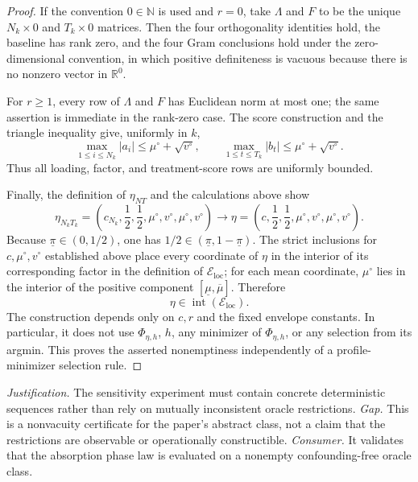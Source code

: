 \documentclass{article}
\begin{document}
\begin{proof}
If the convention \(0\in\mathbb N\) is used and \(r=0\), take \(\Lambda\) and \(F\) to be the unique \(N_k\times0\) and \(T_k\times0\) matrices. Then the four orthogonality identities hold, the baseline has rank zero, and the four Gram conclusions hold under the zero-dimensional convention, in which positive definiteness is vacuous because there is no nonzero vector in \(\mathbb R^0\).

For \(r\ge1\), every row of \(\Lambda\) and \(F\) has Euclidean norm at most one; the same assertion is immediate in the rank-zero case. The score construction and the triangle inequality give, uniformly in \(k\),
\[
 \max_{1\le i\le N_k}|a_i|
 \le\mu^\circ+\sqrt{v^\circ},
 \qquad
 \max_{1\le t\le T_k}|b_t|
 \le\mu^\circ+\sqrt{v^\circ}.
\]
Thus all loading, factor, and treatment-score rows are uniformly bounded.

Finally, the definition of \(\eta_{NT}\) and the calculations above show
\[
 \eta_{N_kT_k}
 =\left(c_{N_k},\frac12,\frac12,
         \mu^\circ,v^\circ,\mu^\circ,v^\circ\right)
 \longrightarrow
 \eta
 =\left(c,\frac12,\frac12,
         \mu^\circ,v^\circ,\mu^\circ,v^\circ\right).
\]
Because \(\underline\pi\in(0,1/2)\), one has \(1/2\in(\underline\pi,1-\underline\pi)\). The strict inclusions for \(c,\mu^\circ,v^\circ\) established above place every coordinate of \(\eta\) in the interior of its corresponding factor in the definition of \(\mathcal E_{\mathrm{loc}}\); for each mean coordinate, \(\mu^\circ\) lies in the interior of the positive component \([\underline\mu,\overline\mu]\). Therefore
\[
 \eta\in\operatorname{int}(\mathcal E_{\mathrm{loc}}).
\]
The construction depends only on \(c,r\) and the fixed envelope constants. In particular, it does not use \(\Phi_{\eta,h}\), \(h\), any minimizer of \(\Phi_{\eta,h}\), or any selection from its argmin. This proves the asserted nonemptiness independently of a profile-minimizer selection rule.
\end{proof}
\par\smallskip\noindent \textit{Justification.} The sensitivity experiment must contain concrete deterministic sequences rather than rely on mutually inconsistent oracle restrictions. \textit{Gap.} This is a nonvacuity certificate for the paper's abstract class, not a claim that the restrictions are observable or operationally constructible. \textit{Consumer.} It validates that the absorption phase law is evaluated on a nonempty confounding-free oracle class.
\end{document}
